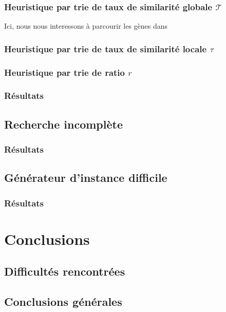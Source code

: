 \documentclass[a4paper,12pt]{article}
\begin{document}
\subsubsection{Heuristique par trie de taux de similarité globale $\mathcal{T}$ }
Ici, nous nous interessons à parcourir les gènes dans 


\subsubsection{Heuristique par trie de taux de similarité locale $\tau$}
\subsubsection{Heuristique par trie de ratio $r$}

\subsubsection{Résultats}

\subsection{Recherche incomplète}
\subsubsection{Résultats}

\subsection{Générateur d'instance difficile}
\subsubsection{Résultats}

\section{Conclusions} 

\subsection{Difficultés rencontrées}

\subsection{Conclusions générales}
\end{document}
